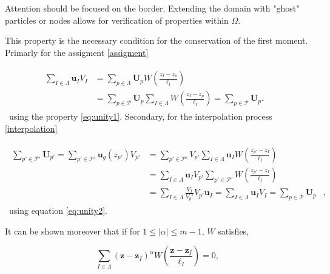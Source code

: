 Attention should be focused on the border. Extending the domain with "ghost" particles or nodes allows for verification of properties within $\Omega$.

This property is the necessary condition for the conservation of the first moment. Primarly for the assigment \ref{assigment}

\begin{gather}
    \begin{align*}
        \sum_{I \in \Lambda} \bm u_I V_I & = \sum_{p \in \Lambda} \bm U_p  W \left(\frac{z_I - z_p}{\ell_I} \right)                                                           & \\
                                         & = \sum_{p \in \mathcal P} \bm U_p \sum_{I \in \Lambda} W \left(\frac{z_I - z_p}{\ell_I} \right) = \sum_{p \in \mathcal P} \bm U_p. &
    \end{align*}
\end{gather}~using the property \eqref{eq:unity1}. Secondary, for the interpolation process \ref{interpolation}

\begin{gather}
    \begin{align*}
        \sum_{p' \in \mathcal P'} \bm U_{p'} = \sum_{p' \in \mathcal P'} \bm u_g(z_{p'}) V_{p'} & = \sum_{p' \in \mathcal P'} V_{p'} \sum_{I \in \Lambda} \bm u_I W \left(\frac{z_{p'} - z_I}{\ell_I}\right)                                                &   \\
                                                                                                & =  \sum_{I \in \Lambda} \bm u_I  V_{p'}\sum_{p' \in \mathcal P'} W \left(\frac{z_{p'} - z_I}{\ell_I}\right)                                               &   \\
                                                                                                & =  \sum_{I \in \Lambda} \frac{V_I}{V_p'} V_{p'} \bm u_I =                            \sum_{I \in \Lambda} \bm u_I V_{I} = \sum_{p \in \mathcal P} \bm U_p & ,
    \end{align*}
\end{gather}~using equation \eqref{eq:unity2}.

It can be shown moreover that if for $1 \leq |\alpha| \leq m - 1$, $W$ satisfies,

\begin{equation}
    \sum_{I \in \Lambda} {(\bm z-\bm z_I)}^\alpha W \left(\frac{\bm z - \bm z_I}{\ell_I} \right) = 0, \label{eq:momentProperty}
\end{equation}

